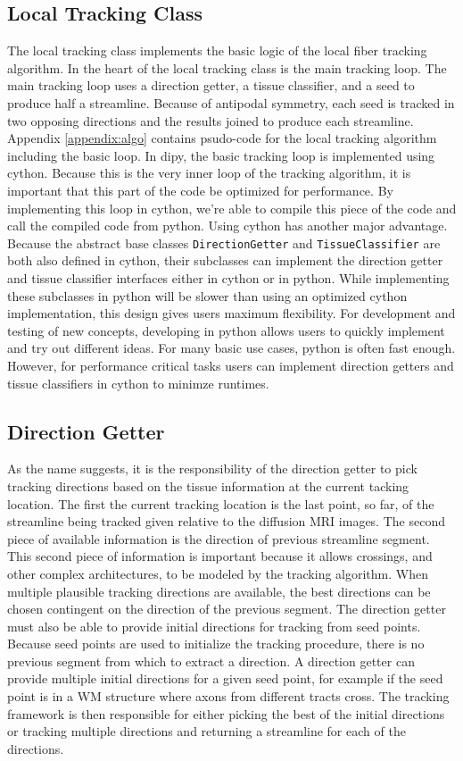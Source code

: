 \subsection{Local Tracking Class}
    The local tracking class implements the basic logic of the local fiber tracking algorithm. In the heart of the local tracking class is the main tracking loop. The main tracking loop uses a direction getter, a tissue classifier, and a seed to produce half a streamline. Because of antipodal symmetry, each seed is tracked in two opposing directions and the results joined to produce each streamline. Appendix \ref{appendix:algo} contains psudo-code for the local tracking algorithm including the basic loop. In dipy, the basic tracking loop is implemented using cython. Because this is the very inner loop of the tracking algorithm, it is important that this part of the code be optimized for performance. By implementing this loop in cython, we're able to compile this piece of the code and call the compiled code from python. Using cython has another major advantage. Because the abstract base classes \verb|DirectionGetter| and \verb|TissueClassifier| are both also defined in cython, their subclasses can implement the direction getter and tissue classifier interfaces either in cython or in python. While implementing these subclasses in python will be slower than using an optimized cython implementation, this design gives users maximum flexibility. For development and testing of new concepts, developing in python allows users to quickly implement and try out different ideas. For many basic use cases, python is often fast enough. However, for performance critical tasks users can implement direction getters and tissue classifiers in cython to minimze runtimes.

\subsection{Direction Getter}
    As the name suggests, it is the responsibility of the direction getter to pick tracking directions based on the tissue information at the current tacking location. The first the current tracking location is the last point, so far, of the streamline being tracked given relative to the diffusion MRI images. The second piece of available information is the direction of previous streamline segment. This second piece of information is important because it allows crossings, and other complex architectures, to be modeled by the tracking algorithm. When multiple plausible tracking directions are available, the best directions can be chosen contingent on the direction of the previous segment. The direction getter must also be able to provide initial directions for tracking from seed points. Because seed points are used to initialize the tracking procedure, there is no previous segment from which to extract a direction. A direction getter can provide multiple initial directions for a given seed point, for example if the seed point is in a WM structure where axons from different tracts cross. The tracking framework is then responsible for either picking the best of the initial directions or tracking multiple directions and returning a streamline for each of the directions.
    
